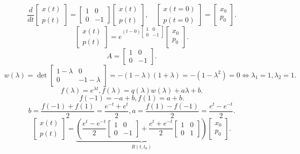 \documentclass[../main.tex]{subfiles}
\begin{document}
\begin{przyklad}
    \[
        \frac{d}{dt}\begin{bmatrix} x(t)\\p(t) \end{bmatrix} = \begin{bmatrix} 1&0\\0&-1 \end{bmatrix} \begin{bmatrix} x(t)\\p(t) \end{bmatrix},\quad \begin{bmatrix} x(t=0)\\p(t=0) \end{bmatrix} = \begin{bmatrix} x_0\\p_0 \end{bmatrix}
    .\]
    \[
        \begin{bmatrix} x(t)\\p(t) \end{bmatrix} = e^{(t-0)\begin{bmatrix} 1&0\\0&-1 \end{bmatrix} }\begin{bmatrix} x_0\\p_0 \end{bmatrix}
    .\]
    \[
        A = \begin{bmatrix} 1&0\\0&-1 \end{bmatrix}
    .\]
    \[
        w(\lambda) = \det \begin{bmatrix} 1-\lambda&0\\0&-1-\lambda \end{bmatrix} = -(1-\lambda)(1+\lambda) = -(1-\lambda^2) = 0 \iff \lambda_1 = 1, \lambda_2 = 1
    .\]
    \[
        f(\lambda) = e^{\lambda t}, f(\lambda) = q(\lambda)w(\lambda) + a\lambda+b
    .\] \[
    f(-1) = -a+b, f(1) = a+b
    .\] \[
    b = \frac{f(-1)+f(1)}{2}= \frac{e^{-t}+e^{t}}{2}, a = \frac{f(1)-f(-1)}{2} = \frac{e^t - e^{-t}}{2}
    .\]
    \[
        \begin{bmatrix} x(t)\\p(t) \end{bmatrix} = \underbrace{ \left( \frac{e^t-e^{-t}}{2}\begin{bmatrix} 1&0\\0&-1 \end{bmatrix} + \frac{e^t+e^{-t}}{2}\begin{bmatrix} 1&0\\0&1  \end{bmatrix}\right) }_{R(t,t_0)} \begin{bmatrix} x_0\\p_0 \end{bmatrix}
    .\]
\end{przyklad}
\end{document}
